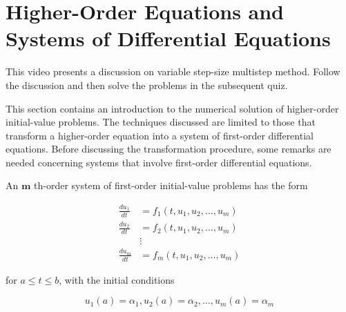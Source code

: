 \section{Higher-Order Equations and Systems of Differential Equations}

\videolesson
\begin{selfvideo}[2]
This video presents a discussion on variable step-size multistep method. Follow the discussion and then solve the problems in the subsequent quiz.
\end{selfvideo}


This section contains an introduction to the numerical solution of higher-order initial-value problems. The techniques discussed are limited to those that transform a higher-order equation into a system of first-order differential equations. Before discussing the transformation procedure, some remarks are needed concerning systems that involve first-order differential equations.

An $\boldsymbol{m}$ th-order system of first-order initial-value problems has the form

\begin{equation}\label{eqn:hoesdeeq1}
\begin{split}
\frac{d u_{1}}{d t} & =f_{1}\left(t, u_{1}, u_{2}, \ldots, u_{m}\right) \\
\frac{d u_{2}}{d t} & =f_{2}\left(t, u_{1}, u_{2}, \ldots, u_{m}\right) \\
& \vdots  \\
\frac{d u_{m}}{d t} & =f_{m}\left(t, u_{1}, u_{2}, \ldots, u_{m}\right)
\end{split}
\end{equation}


for $a \leq t \leq b$, with the initial conditions


\begin{equation}\label{eqn:hoesdeeq2}
u_{1}(a)=\alpha_{1}, u_{2}(a)=\alpha_{2}, \ldots, u_{m}(a)=\alpha_{m} \tag{5.46}
\end{equation}


